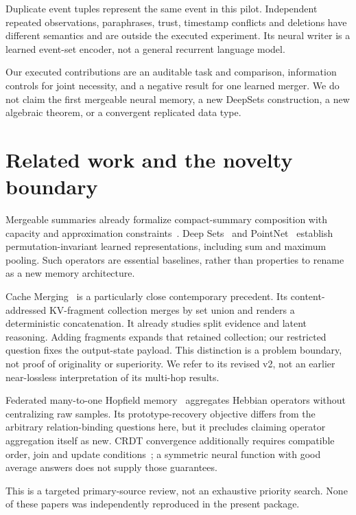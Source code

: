 \documentclass[10pt]{article}
\begin{document}
Duplicate event tuples represent the same event in this pilot. Independent
repeated observations, paraphrases, trust, timestamp conflicts and deletions
have different semantics and are outside the executed experiment. Its neural
writer is a learned event-set encoder, not a general recurrent language model.

Our executed contributions are an auditable task and comparison, information
controls for joint necessity, and a negative result for one learned merger.
We do not claim the first mergeable neural memory, a new DeepSets construction,
a new algebraic theorem, or a convergent replicated data type.

\section{Related work and the novelty boundary}
Mergeable summaries already formalize compact-summary composition with capacity
and approximation constraints~\cite{summaries}. Deep Sets~\cite{deepsets} and
PointNet~\cite{pointnet} establish permutation-invariant learned representations,
including sum and maximum pooling. Such operators are essential baselines,
rather than properties to rename as a new memory architecture.

Cache Merging~\cite{cache} is a particularly close contemporary precedent. Its
content-addressed KV-fragment collection merges by set union and renders a
deterministic concatenation. It already studies split evidence and latent
reasoning. Adding fragments expands that retained collection; our restricted
question fixes the output-state payload. This distinction is a problem boundary,
not proof of originality or superiority. We refer to its revised v2, not an
earlier near-lossless interpretation of its multi-hop results.

Federated many-to-one Hopfield memory~\cite{hopfield} aggregates Hebbian operators
without centralizing raw samples. Its prototype-recovery objective differs
from the arbitrary relation-binding questions here, but it precludes claiming
operator aggregation itself as new. CRDT convergence additionally requires
compatible order, join and update conditions~\cite{crdt}; a symmetric neural
function with good average answers does not supply those guarantees.

This is a targeted primary-source review, not an exhaustive priority search.
None of these papers was independently reproduced in the present package.
\end{document}
